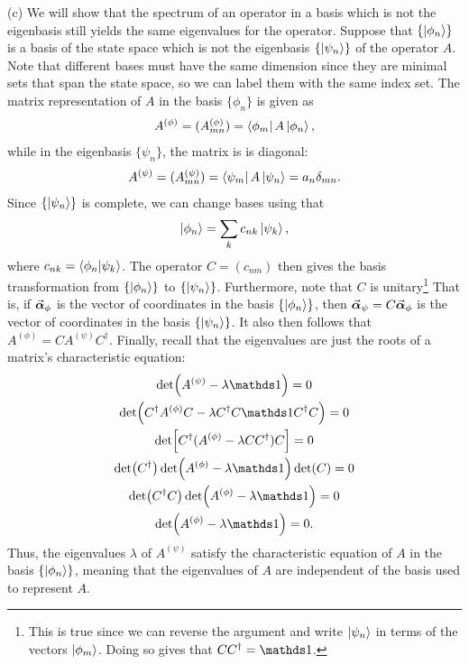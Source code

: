 {(c) We will show that the spectrum of an operator in a basis which is not the eigenbasis still yields the same eigenvalues for the operator.
Suppose that $\{ \ket{\phi_{n}} \} $ is a basis of the state space which is not the eigenbasis $\{ \ket{\psi_{n}} \} $ of the operator $A$.
Note that different bases must have the same dimension since they are minimal sets that span the state space, so we can label them with the same index set.
The matrix representation of $A$ in the basis $\{ \phi_{n} \}$ is given as
\begin{eqnarray}
    A^{(\phi)} = (A^{(\phi)}_{mn}) = \bra{\phi_{m}} A \ket{\phi_{n}}
,\end{eqnarray}
while in the eigenbasis $\{ \psi_{n} \} $, the matrix is is diagonal:
\begin{eqnarray}
    A^{(\psi)} = (A^{(\psi)}_{mn}) = \bra{\psi_{m}} A \ket{\psi_{n}} = a_{n} \delta_{mn}
.\end{eqnarray}
Since $\{ \ket{\psi_{n}} \} $ is complete, we can change bases using that
\begin{eqnarray}
    \ket{ \phi_{n} } = \sum_{k} c_{nk} \ket{\psi_{k}}
,\end{eqnarray}
where $c_{nk} = \bra{\phi_{n}}\ket{\psi_{k}}$.
The operator $C = (c_{nm})$ then gives the basis transformation from $\{ \ket{ \phi_{n} } \} $ to $\{ \ket{\psi_{n}} \} $.
Furthermore, note that $C$ is unitary\footnote{This is true since we can reverse the argument and write $\ket{\psi_{n}}$ in terms of the vectors $\ket{\phi_{m}}$. Doing so gives that $C C^{\dagger} = \id$.}
That is, if $\va*{\alpha}_{\phi}$ is the vector of coordinates in the basis $\{ \ket{ \phi_{n} } \} $, then $\va*{\alpha}_{\psi} = C \va*{\alpha}_{\phi}$ is the vector of coordinates in the basis $\{ \ket{ \psi_{n} } \} $.
It also then follows that $A^{(\phi)} = C A^{(\psi)} C^{\dagger}$.
Finally, recall that the eigenvalues are just the roots of a matrix's characteristic equation:
\begin{gather}
    \det(A^{(\psi)} - \lambda \id) = 0 \nonumber \\
    \det(C^{\dagger} A^{(\phi)} C - \lambda C^{\dagger} C \id C^{\dagger} C) = 0 \nonumber \\
    \det[ C^{\dagger} ( A^{(\phi)} - \lambda C C^{\dagger} ) C ] = 0 \nonumber \\
    \det(C^{\dagger}) \det(A^{(\phi)} - \lambda \id ) \det(C) = 0 \nonumber \\
    \det(C^{\dagger} C) \det(A^{(\phi)} - \lambda \id) = 0 \nonumber \\
    \det(A^{(\phi)} - \lambda \id) = 0
.\end{gather}
Thus, the eigenvalues $\lambda$ of $A^{(\psi)}$ satisfy the characteristic equation of $A$ in the basis $\{ \ket{\phi_{n}} \}$, meaning that the eigenvalues of $A$ are independent of the basis used to represent $A$.

}
